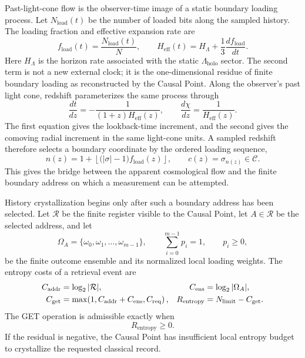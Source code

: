 \documentclass[11pt,letterpaper]{article}
\theoremstyle{plain}
\newcommand{\Lholo}{\Lambda_{\text{holo}}}
\newcommand{\Nbits}{N}
\begin{document}
Past-light-cone flow is the observer-time image of a static boundary loading
process.  Let $N_{\text{load}}(t)$ be the number of loaded bits along the sampled
history.  The loading fraction and effective expansion rate are
\begin{equation}
\label{eq:section-seven-loading-law}
 \boxed{
 f_{\text{load}}(t)
 =
 \frac{N_{\text{load}}(t)}{\Nbits},
 \qquad
 H_{\text{eff}}(t)
 =
 H_{\Lambda}+\frac{1}{3}\frac{df_{\text{load}}}{dt}.
 }
\end{equation}
Here $H_{\Lambda}$ is the horizon rate associated with the static
$\Lholo$ sector.  The second term is not a new external clock; it is the
one-dimensional residue of finite boundary loading as reconstructed by the
Causal Point.  Along the observer's past light cone, redshift parameterizes the
same process through
\begin{equation}
\label{eq:section-seven-past-light-cone-flow}
 \boxed{
 \frac{dt}{dz}
 =
 -\frac{1}{(1+z)H_{\text{eff}}(z)},
 \qquad
 \frac{d\chi}{dz}
 =
 \frac{1}{H_{\text{eff}}(z)}.
 }
\end{equation}
The first equation gives the lookback-time increment, and the second gives the
comoving radial increment in the same light-cone units.  A sampled redshift
therefore selects a boundary coordinate by the ordered loading sequence,
\begin{equation}
\label{eq:section-seven-coordinate-flow}
 n(z)
 =
 1+
 \left\lfloor\bigl(|\sigma|-1\bigr)f_{\text{load}}(z)\right\rfloor,
 \qquad
 c(z)=\sigma_{n(z)}\in\mathcal C.
\end{equation}
This gives the bridge between the apparent cosmological flow and the finite
boundary address on which a measurement can be attempted.

History crystallization begins only after such a boundary address has been
selected.  Let $\mathcal R$ be the finite register visible to the Causal Point,
let $A\in\mathcal R$ be the selected address, and let
\begin{equation}
\label{eq:section-seven-outcome-ensemble}
 \Omega_A
 =
 \{\omega_0,\omega_1,\ldots,\omega_{m-1}\},
 \qquad
 \sum_{i=0}^{m-1}p_i=1,
 \qquad
 p_i\ge0,
\end{equation}
be the finite outcome ensemble and its normalized local loading weights.  The
entropy costs of a retrieval event are
\begin{align}
\label{eq:section-seven-retrieval-costs}
 C_{\text{addr}}
 &=
 \log_2|\mathcal R|,
 &
 C_{\text{ens}}
 &=
 \log_2|\Omega_A|,\notag\\
 C_{\text{get}}
 &=
 \max\!\left(1,C_{\text{addr}}+C_{\text{ens}},C_{\text{req}}\right),
 &
 R_{\text{entropy}}
 &=
 N_{\text{limit}}-C_{\text{get}}.
\end{align}
The GET operation is admissible exactly when
\begin{equation}
\label{eq:section-seven-retrieval-admissibility}
 R_{\text{entropy}}\ge0.
\end{equation}
If the residual is negative, the Causal Point has insufficient local entropy
budget to crystallize the requested classical record.
\end{document}

